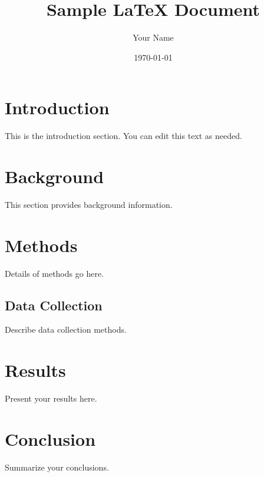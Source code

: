 \documentclass{article}
\title{Sample LaTeX Document}
\author{Your Name}
\date{\today}
\begin{document}
\maketitle
\tableofcontents

\section{Introduction}
This is the introduction section. You can edit this text as needed.

\section{Background}
This section provides background information.
\lipsum[1]

\section{Methods}
Details of methods go here.
\subsection{Data Collection}
Describe data collection methods.

\section{Results}
Present your results here.
\lipsum[2]

\section{Conclusion}
Summarize your conclusions.
\end{document}
